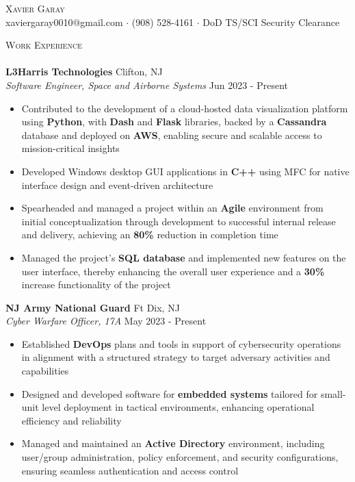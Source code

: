 \documentclass[a4paper]{article}
\newcommand{\lineunder} {
        \vspace*{-8pt} \\
        \hspace*{-18pt} \hrulefill \\
    }
\newcommand{\header} [1] {
        {\hspace*{-18pt}\vspace*{6pt} \textsc{#1}}
        \vspace*{-6pt} \lineunder
    }
\begin{document}
    \vspace*{-40pt}
    
\vspace*{-10pt}
\begin{center}{\Huge \scshape {Xavier Garay}}\\
xaviergaray0010@gmail.com $\cdot$ (908) 528-4161 $\cdot$ DoD TS/SCI Security Clearance\\
\end{center}
\header{Work Experience}

                \textbf{L3Harris Technologies} \hfill Clifton, NJ\\
                \textit{Software Engineer, Space and Airborne Systems} \hfill Jun 2023 - Present\\
                \vspace{-1mm}
                \begin{itemize} \itemsep 1pt
                
                \item Contributed to the development of a cloud-hosted data visualization platform using \textbf{Python}, with \textbf{Dash} and \textbf{Flask} libraries, backed by a \textbf{Cassandra} database and deployed on \textbf{AWS}, enabling secure and scalable access to mission-critical insights
                \item Developed Windows desktop GUI applications in \textbf{C++} using MFC for native interface design and event-driven architecture
                \item Spearheaded and managed a project within an \textbf{Agile} environment from initial conceptualization through development to successful internal release and delivery, achieving an \textbf{80\%} reduction in completion time
                \item Managed the project’s \textbf{SQL database} and implemented new features on the user interface, thereby enhancing the overall user experience and a \textbf{30\%} increase functionality of the project\end{itemize}
                \textbf{NJ Army National Guard} \hfill Ft Dix, NJ\\
                \textit{Cyber Warfare Officer, 17A} \hfill May 2023 - Present\\
                \vspace{-1mm}
                \begin{itemize} \itemsep 1pt
                
                \item Established \textbf{DevOps} plans and tools in support of cybersecurity operations in alignment with a structured strategy to target adversary activities and capabilities
                \item Designed and developed software for \textbf{embedded systems} tailored for small-unit level deployment in tactical environments, enhancing operational efficiency and reliability
                \item Managed and maintained an \textbf{Active Directory} environment, including user/group administration, policy enforcement, and security configurations, ensuring seamless authentication and access control\end{itemize}
\end{document}
